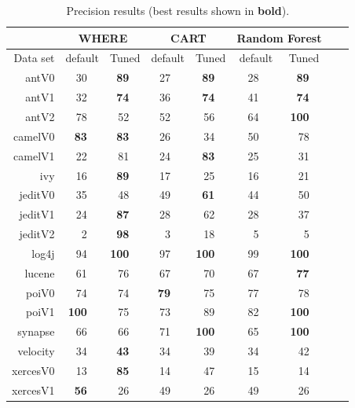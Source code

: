 \documentclass{sig-alternative}
\begin{document}
 
\begin{table}[!t]
\renewcommand{\baselinestretch}{0.8} 

\scriptsize    

\begin{tabular}{r|rl|rl|rl|rl|rl|rlrl}
      &   \multicolumn{4}{c|}{WHERE}         &   \multicolumn{4}{c|}{CART}         &   \multicolumn{4}{c}{Random Forest}         \\\hline
  Data set   &   \multicolumn{2}{c}{default}         &   \multicolumn{2}{c|}{Tuned}         &   \multicolumn{2}{c}{default}         &   \multicolumn{2}{c|}{Tuned}    &   \multicolumn{2}{c}{default}  &   \multicolumn{2}{c}{Tuned}\\\hline
antV0 & 30 &   & {\bf 89} &   & 27 &   & {\bf 89} &   & 28 &   & {\bf 89} &  \\
antV1 & 32 &   & {\bf 74} &   & 36 &   & {\bf 74} &   & 41 &   & {\bf 74} &  \\
antV2 & 78 &   & 52 &   & 52 &   & 56 &   & 64 &   & {\bf 100} &  \\
camelV0 & {\bf 83} &   & {\bf 83} &   & 26 &   & 34 &   & 50 &   & 78 &  \\
camelV1 & 22 &   & 81 &   & 24 &   & {\bf 83} &   & 25 &   & 31 &  \\
ivy & 16 &   & {\bf 89} &   & 17 &   & 25 &   & 16 &   & 21 &  \\
jeditV0 & 35 &   & 48 &   & 49 &   & {\bf 61} &   & 44 &   & 50 &  \\
jeditV1 & 24 &   & {\bf 87} &   & 28 &   & 62 &   & 28 &   & 37 &  \\
jeditV2 & 2 &   & {\bf 98} &   & 3 &   & 18 &   & 5 &   & 5 &  \\
log4j & 94 &   & {\bf 100} &   & 97 &   & {\bf 100} &   & 99 &   & {\bf 100} &  \\
lucene & 61 &   & 76 &   & 67 &   & 70 &   & 67 &   & {\bf 77} &  \\
poiV0 & 74 &   & 74 &   & {\bf 79} &   & 75 &   & 77 &   & 78 &  \\
poiV1 & {\bf 100} &   & 75 &   & 73 &   & 89 &   & 82 &   & {\bf 100} &  \\
synapse & 66 &   & 66 &   & 71 &   & {\bf 100} &   & 65 &   & {\bf 100} &  \\
velocity & 34 &   & {\bf 43} &   & 34 &   & 39 &   & 34 &   & 42 &  \\
xercesV0 & 13 &   & {\bf 85} &   & 14 &   & 47 &   & 15 &   & 14 &  \\
xercesV1 & {\bf 56} &   & 26 &   & 49 &   & 26 &   & 49 &   & 26 &  \\
\end{tabular}
\caption{Precision results (best results  shown in {\bf bold}).}
\label{tab:precisionbars}
\end{table}
 
\end{document}
